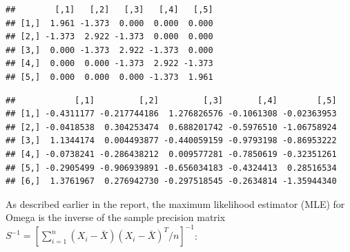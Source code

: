 \documentclass[12pt,]{book}
\newenvironment{Shaded}{\begin{snugshade}}{\end{snugshade}}
\newcommand{\CommentTok}[1]{\textcolor[rgb]{0.56,0.35,0.01}{\textit{#1}}}
\newcommand{\DataTypeTok}[1]{\textcolor[rgb]{0.13,0.29,0.53}{#1}}
\newcommand{\DecValTok}[1]{\textcolor[rgb]{0.00,0.00,0.81}{#1}}
\newcommand{\FloatTok}[1]{\textcolor[rgb]{0.00,0.00,0.81}{#1}}
\newcommand{\KeywordTok}[1]{\textcolor[rgb]{0.13,0.29,0.53}{\textbf{#1}}}
\newcommand{\NormalTok}[1]{#1}
\newcommand{\OperatorTok}[1]{\textcolor[rgb]{0.81,0.36,0.00}{\textbf{#1}}}
\newcommand{\OtherTok}[1]{\textcolor[rgb]{0.56,0.35,0.01}{#1}}
\newcommand{\StringTok}[1]{\textcolor[rgb]{0.31,0.60,0.02}{#1}}
\theoremstyle{definition}
\theoremstyle{definition}
\theoremstyle{definition}
\theoremstyle{remark}
\begin{document}
\begin{verbatim}
##        [,1]   [,2]   [,3]   [,4]   [,5]
## [1,]  1.961 -1.373  0.000  0.000  0.000
## [2,] -1.373  2.922 -1.373  0.000  0.000
## [3,]  0.000 -1.373  2.922 -1.373  0.000
## [4,]  0.000  0.000 -1.373  2.922 -1.373
## [5,]  0.000  0.000  0.000 -1.373  1.961
\end{verbatim}

\begin{Shaded}
\end{Shaded}

\begin{verbatim}
##            [,1]         [,2]         [,3]       [,4]        [,5]
## [1,] -0.4311177 -0.217744186  1.276826576 -0.1061308 -0.02363953
## [2,] -0.0418538  0.304253474  0.688201742 -0.5976510 -1.06758924
## [3,]  1.1344174  0.004493877 -0.440059159 -0.9793198 -0.86953222
## [4,] -0.0738241 -0.286438212  0.009577281 -0.7850619 -0.32351261
## [5,] -0.2905499 -0.906939891 -0.656034183 -0.4324413  0.28516534
## [6,]  1.3761967  0.276942730 -0.297518545 -0.2634814 -1.35944340
\end{verbatim}

\vspace{0.5cm}

As described earlier in the report, the maximum likelihood estimator
(MLE) for Omega is the inverse of the sample precision matrix
\(S^{-1} = \left[\sum_{i = 1}^{n}(X_{i} - \bar{X})(X_{i} - \bar{X})^{T}/n \right]^{-1}\):
\end{document}
